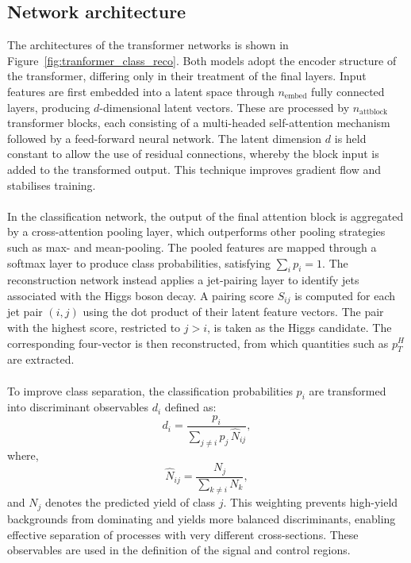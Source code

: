 \subsection{Network architecture}
The architectures of the transformer networks is shown in Figure~\ref{fig:tranformer_class_reco}. Both models adopt the encoder structure of the transformer, differing only in their treatment of the final layers. Input features are first embedded into a latent space through $n_{\text{embed}}$ fully connected layers, producing $d$-dimensional latent vectors. These are processed by $n_{\text{attblock}}$ transformer blocks, each consisting of a multi-headed self-attention mechanism followed by a feed-forward neural network. The latent dimension $d$ is held constant to allow the use of residual connections, whereby the block input is added to the transformed output. This technique improves gradient flow and stabilises training.\\
\\
In the classification network, the output of the final attention block is aggregated by a cross-attention pooling layer, which outperforms other pooling strategies such as max- and mean-pooling. The pooled features are mapped through a softmax layer to produce class probabilities, satisfying $\sum_{i} p_{i} = 1$. The reconstruction network instead applies a jet-pairing layer to identify jets associated with the Higgs boson decay. A pairing score $S_{ij}$ is computed for each jet pair $(i,j)$ using the dot product of their latent feature vectors. The pair with the highest score, restricted to $j>i$, is taken as the Higgs candidate. The corresponding four-vector is then reconstructed, from which quantities such as $p_{T}^{H}$ are extracted.\\
\\
To improve class separation, the classification probabilities $p_{i}$ are transformed into discriminant observables $d_{i}$ defined as:
\begin{equation}
d_{i} = \frac{p_{i}}{\sum_{j \neq i} p_{j} \, \hat{N}_{ij}},
\end{equation}
where,
\begin{equation}
\hat{N}_{ij} = \frac{N_{j}}{\sum_{k \neq i} N_{k}},
\end{equation}
and $N_{j}$ denotes the predicted yield of class $j$. This weighting prevents high-yield backgrounds from dominating and yields more balanced discriminants, enabling effective separation of processes with very different cross-sections. These observables are used in the definition of the signal and control regions.\\
